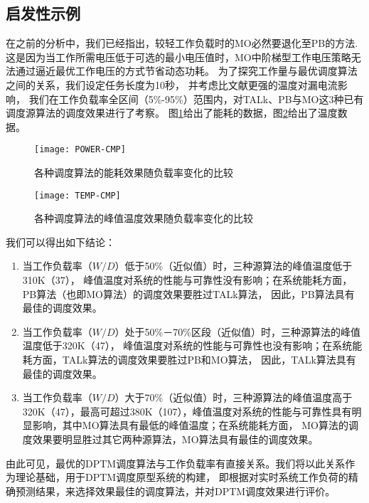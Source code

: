 \subsection{启发性示例}
在之前的分析中，我们已经指出，较轻工作负载时的MO必然要退化至PB的方法. 这是因为当工作所需电压低于可选的最小电压值时，MO中阶梯型工作电压策略无法通过逼近最优工作电压的方式节省动态功耗。 为了探究工作量与最优调度算法之间的关系，我们设定任务长度为10秒， 并考虑比文献更强的温度对漏电流影响， 我们在工作负载率全区间（5\%-95\%）范围内，对TALk、PB与MO这3种已有调度源算法的调度效果进行了考察。 图\ref{fig:exp-power-cmp}给出了能耗的数据，图\ref{fig:exp-temp-cmp}给出了温度数据。
\begin{figure}%
  \centering
  \texttt{[image: POWER-CMP]}
  \caption{各种调度算法的能耗效果随负载率变化的比较}
  \label{fig:exp-power-cmp}
\end{figure}
\begin{figure}%
  \centering
  \texttt{[image: TEMP-CMP]}
  \caption{各种调度算法的峰值温度效果随负载率变化的比较}
  \label{fig:exp-temp-cmp}
\end{figure}我们可以得出如下结论：
\begin{enumerate}[1)]
\item 当工作负载率（$W/D$）低于50\%（近似值）时，三种源算法的峰值温度低于310K（37\celsius）， 峰值温度对系统的性能与可靠性没有影响；在系统能耗方面，PB算法（也即MO算法）的调度效果要胜过TALk算法， 因此，PB算法具有最佳的调度效果。
\item 当工作负载率（$W/D$）处于50\%－70\%区段（近似值）时，三种源算法的峰值温度低于320K（47\celsius）， 峰值温度对系统的性能与可靠性也没有影响；在系统能耗方面，TALk算法的调度效果要胜过PB和MO算法， 因此，TALk算法具有最佳的调度效果。
\item 当工作负载率（$W/D$）大于70\%（近似值）时，三种源算法的峰值温度高于320K（47\celsius ），最高可超过380K（107\celsius ），峰值温度对系统的性能与可靠性具有明显影响，其中MO算法具有最低的峰值温度；在系统能耗方面， MO算法的调度效果要明显胜过其它两种源算法，MO算法具有最佳的调度效果。
\end{enumerate}

由此可见，最优的DPTM调度算法与工作负载率有直接关系。我们将以此关系作为理论基础，用于DPTM调度原型系统的构建， 即根据对实时系统工作负荷的精确预测结果，来选择效果最佳的调度算法，并对DPTM调度效果进行评价。

